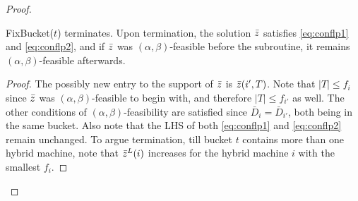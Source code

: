\documentclass{article}[11pt]
\newcommand{\brt}{{(t)}}
\newcommand{\barD}{\bar{D}}
\begin{document}
\begin{proof}
	\begin{claim}\label{clm:step2}
		{\sf FixBucket}($t$) terminates. Upon termination, the solution $\bar z$ satisfies \eqref{eq:conflp1} and \eqref{eq:conflp2}, and
		if $\bar z$ was $(\alpha,\beta)$-feasible before the subroutine, it remains $(\alpha,\beta)$-feasible afterwards.
	\end{claim}
	\begin{proof}
		The possibly new entry to the support of $\bar z$ is $\bar z(i',T)$. Note that $|T| \leq f_i$ since $\bar z$ was $(\alpha,\beta)$-feasible to begin with,  and therefore $|T|\leq f_{i'}$ as well.
		The other conditions of $(\alpha,\beta)$-feasibility are satisfied since $\barD_i = \barD_{i'}$, both being in the same bucket.
		Also note that the LHS of both \eqref{eq:conflp1} and \eqref{eq:conflp2} remain unchanged.
		To argue termination, till bucket $t$ contains more than one hybrid machine, note that $\bar z^L(i)$ increases for the hybrid machine $i$ with the smallest $f_i$. 
	\end{proof}
	
	
	
	
	
	

\end{proof}
\end{document}
